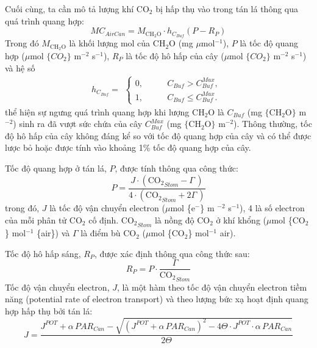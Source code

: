 \documentclass[a4paper]{article}
\begin{document}
Cuối cùng, ta cần mô tả lượng khí $\mathrm{CO_2}$ bị hấp thụ vào trong tán lá thông qua quá trình quang hợp:
\begin{equation}\label{eq:18}
    MC_{AirCan} = M_{\mathrm{CH_{2}O}}\cdot h_{C_{Buf}}(P - R_P)
\end{equation}
Trong đó $M_{\mathrm{CH_{2}O}}$ là khối lượng mol của $\mathrm{CH_{2}O}$ (mg $\mu$mol$^{-1}$), $P$ là tốc độ quang hợp ($\mu$mol $\{CO_2\}$ m$^{-2}$ s$^{-1}$), $R_P$ là tốc độ hô hấp của cây ($\mu$mol $\{CO_2\}$ m$^{-2}$ s$^{-1}$) và hệ số 
\begin{equation}\label{eq:19}
    h_{C_{Buf}} = 
    \begin{aligned}
        \begin{cases}
            0, \qquad &C_{Buf} > C^{Max}_{Buf}, \\
            1, \qquad &C_{Buf} \leq C^{Max}_{Buf}.
        \end{cases}
    \end{aligned}
\end{equation}
thể hiện sự ngưng quá trình quang hợp khi lượng $\mathrm{CH_{2}O}$ là $C_{Buf}$ (mg $\{\mathrm{CH_{2}O}\}$ m$^{-2}$) sinh ra đã vượt sức chứa của cây $C^{Max}_{Buf}$ (mg $\{\mathrm{CH_{2}O}\}$ m$^{-2}$). Thông thường, tốc độ hô hấp của cây không đáng kể so với tốc độ quang hợp của cây và có thể được lược bỏ hoặc được tính vào khoảng 1\% tốc độ quang hợp của cây. 
\par
Tốc độ quang hợp ở tán lá, $P$, được tính thông qua công thức:
\begin{equation}\label{eq:P_farquhar}
    P = \dfrac{J\cdot(\mathrm{CO_2}_{Stom} - \Gamma\,)}{4\cdot(\mathrm{CO_2}_{Stom} + 2 \Gamma\,)}
\end{equation}
trong đó, $J$ là tốc độ vận chuyển electron ($\mu$mol \{e$^-$\} m $^{-2}$ s$^{-1}$), 4 là số electron của mỗi phân tử $\mathrm{CO_2}$ cố định. $\mathrm{CO_2}_{Stom}$ là nồng độ $\mathrm{CO_2}$ ở khí khổng ($\mu$mol \{$\mathrm{CO_2}$\} mol$^{-1}$ \{air\}) và $\Gamma$ là điểm bù $\mathrm{CO_2}$ ($\mu$mol \{$\mathrm{CO_2}$\} mol$^{-1}$ {air}).
\par
Tốc độ hô hấp sáng, $R_P$, được xác định thông qua công thức sau:
\begin{equation}\label{eq:R}
    R_P = P \cdot \dfrac{\Gamma}{\mathrm{CO_2}_{Stom}}
\end{equation}
Tốc độ vận chuyển electron, $J$, là một hàm theo tốc độ vận chuyển electron tiềm năng (potential rate of electron transport) và theo lượng bức xạ hoạt định quang hợp hấp thụ bởi tán lá:
\begin{equation}\label{eq:J}
    J = \dfrac{J^{POT} + \alpha\,PAR_{Can} - \sqrt{(J^{POT} + \alpha\,PAR_{Can})^2 - 4\Theta\cdot J^{POT} \cdot \alpha\,PAR_{Can}}}{2\Theta}
\end{equation}
\end{document}
